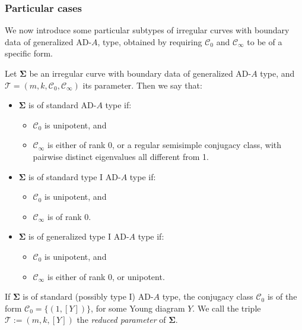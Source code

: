 \documentclass[11pt,a4paper]{amsart}
\numberwithin{equation}{section}
\begin{document}
\subsubsection{Particular cases} We now introduce some particular subtypes of irregular curves with boundary data of generalized AD-$A$, type, obtained by requiring $\mathcal C_0$ and $\mathcal C_\infty$ to be of a specific form.

\begin{definition}
\label{def:particular_AD-A_types}
Let $\bm \Sigma$ be an irregular curve with boundary data of generalized AD-$A$ type, and $\mathcal T=(m, k, \mathcal C_0, \mathcal C_\infty)$ its parameter. Then we say that:
\begin{itemize}

\item $\bm \Sigma$ is of standard AD-$A$ type if:
\begin{itemize}
\item $\mathcal C_0$ is unipotent, and 
\item $\mathcal C_\infty$ is either of rank 0, or a regular semisimple conjugacy class, with pairwise distinct eigenvalues all different from 1. 
\end{itemize}

\item $\bm \Sigma$ is of standard type I AD-$A$ type if:
\begin{itemize}
\item $\mathcal C_0$ is unipotent, and 
\item $\mathcal C_\infty$ is of rank 0.
\end{itemize}

\item $\bm \Sigma$ is of generalized type I AD-$A$ type if:
\begin{itemize}
\item $\mathcal C_0$ is unipotent, and 
\item $\mathcal C_\infty$ is either of rank 0, or unipotent.
\end{itemize}
\end{itemize}
If $\bm\Sigma$ is of standard (possibly type I) AD-$A$ type, the conjugacy class $\mathcal C_0$ is of the form $\mathcal C_0=\{(1, [Y])\}$, for some Young diagram $Y$. We call the triple $\mathscr T:=(m,k, [Y])$ the \emph{reduced parameter} of $\bm\Sigma$.
\end{definition}
\end{document}

